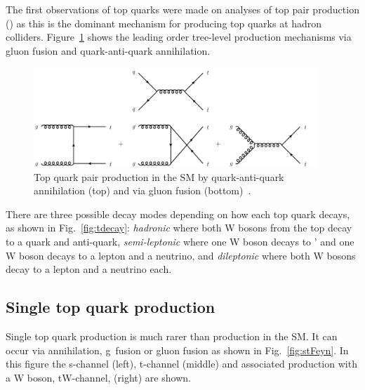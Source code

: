 The first observations of top quarks were made on analyses of top pair production (\ttbar) as this is the dominant mechanism for producing top quarks at hadron colliders. Figure~\ref{fig:ttproduction} shows the leading order tree-level production mechanisms via gluon fusion and quark-anti-quark annihilation. 

\begin{figure}[ht!]
\begin{center}
    \includegraphics[width=0.95\textwidth]{images/Theory/ttbarfeynman.png}
    \caption{Top quark pair production in the SM by quark-anti-quark annihilation (top) and via gluon fusion (bottom)~\cite{Kohn:2012ksa}.}
    \label{fig:ttproduction}
\end{center}
\end{figure}

There are three possible decay modes depending on how each top quark decays, as shown in Fig.~\ref{fig:tdecay}: \emph{hadronic} where both W bosons from the top decay to a quark and anti-quark, \emph{semi-leptonic} where one W boson decays to \qqbar' and one W boson decays to a lepton and a neutrino, and \emph{dileptonic} where both W bosons decay to a lepton and a neutrino each.


\subsection{Single top quark production}

Single top quark production is much rarer than \ttbar production in the SM. It can occur via \qqbar annihilation, g\cPq~fusion or gluon fusion as shown in Fig.~\ref{fig:stFeyn}. In this figure the s-channel (left), t-channel (middle) and associated production with a W boson, tW-channel, (right) are shown.

